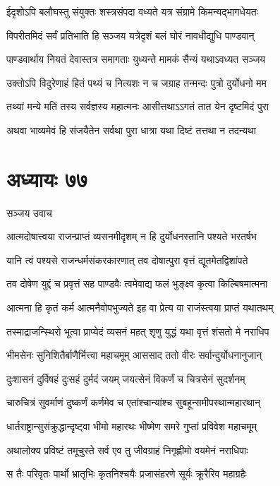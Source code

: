 \twolineshloka
{ईदृशोऽपि बलौघस्तु संयुक्तः शस्त्रसंपदा}
{वध्यते यत्र संग्रामे किमन्यद्भागधेयतः}


\twolineshloka
{विपरीतमिदं सर्वं प्रतिभाति हि सञ्जय}
{यत्रेदृशं बलं घोरं नावधीद्युधि पाण्डवान्}


\twolineshloka
{पाण्डवार्थाय नियतं देवास्तत्र समागताः}
{युध्यन्ते मामकं सैन्यं यथाऽवध्यत सञ्जय}


\twolineshloka
{उक्तोऽपि विदुरेणाहं हितं पथ्यं च नित्यशः}
{न च जग्राह तन्मन्दः पुत्रो दुर्योधनो मम}


\twolineshloka
{तथ्यां मन्ये मतिं तस्य सर्वज्ञस्य महात्मनः}
{आसीत्तथाऽऽगतं तात येन दृष्टमिदं पुरा}


\twolineshloka
{अथवा भाव्यमेवं हि संजयैतेन सर्वथा}
{पुरा धात्रा यथा दिष्टं तत्तथा न तदन्यथा}


\chapter{अध्यायः ७७}
\twolineshloka
{सञ्जय उवाच}
{}


\twolineshloka
{आत्मदोषात्त्वया राजन्प्राप्तं व्यसनमीदृशम्}
{न हि दुर्योधनस्तानि पश्यते भरतर्षभ}


\twolineshloka
{यानि त्वं पश्यसे राजन्धर्मसंकरकारणात्}
{तव दोषात्पुरा वृत्तं द्यूतमेतद्विशांपते}


\twolineshloka
{तव दोषेण युद्दं च प्रवृत्तं सह पाण्डवैः}
{त्वमेवाद्य फलं भुङ्क्ष्व कृत्वा किल्बिषमात्मना}


\twolineshloka
{आत्मना हि कृतं कर्म आत्मनैवोपभुज्यते}
{इह वा प्रेत्य वा राजंस्त्वया प्राप्तं यथातथम्}


\twolineshloka
{तस्माद्राजन्स्थिरो भूत्वा प्राप्येदं व्यसनं महत्}
{शृणु युद्धं यथा वृत्तं शंसतो मे नराधिप}


\twolineshloka
{भीमसेनः सुनिशितैर्बाणैर्भित्त्वा महाचमूम्}
{आससाद ततो वीरः सर्वान्दुर्योधनानुजान्}


\twolineshloka
{दुःशासनं दुर्विषहं दुःसहं दुर्मदं जयम्}
{जयत्सेनं विकर्णं च चित्रसेनं सुदर्शनम्}


\twolineshloka
{चारुचित्रं सुवर्माणं दुष्कर्णं कर्णमेव च}
{एतांश्चान्यांश्च सुबहून्समीपस्थान्महारथान्}


\twolineshloka
{धार्तराष्ट्रान्सुसंक्रुद्धान्दृष्ट्वा भीमो महारथः}
{भीष्मेण समरे गुप्तां प्रविवेश महाचमूम्}


\twolineshloka
{अथालोक्य प्रविष्टं तमूचुस्ते सर्व एव तु}
{जीवग्राहं निगृह्णीमो वयमेनं नराधिपाः}


\twolineshloka
{स तैः परिवृतः पार्थो भ्रातृभिः कृतनिश्चयैः}
{प्रजासंहरणे सूर्यः क्रूरैरिव महाग्रहैः}


